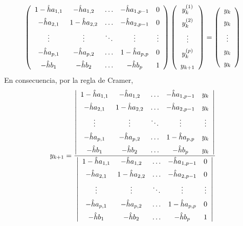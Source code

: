 \documentclass[11pt]{report}
\theoremstyle{mytheorem}
\theoremstyle{mydefinition}
\theoremstyle{myexample}
\begin{document}
\[\left( \begin{array}{ccccc}
     1-\hat{h}a_{1,1} & -\hat{h}a_{1,2} & \mathellipsis & -\hat{h}a_{1,p-1} & 0 \\[5pt]
     -\hat{h}a_{2,1} & 1-\hat{h}a_{2,2} & \mathellipsis & -\hat{h}a_{2,p-1} & 0 \\[5pt]
     \vdots & \vdots & \ddots & \vdots & \vdots \\[5pt]
     -\hat{h}a_{p,1} & -\hat{h}a_{p,2} & \mathellipsis & 1-\hat{h}a_{p,p} & 0 \\[5pt]
     -\hat{h}b_1 & -\hat{h}b_2 & \mathellipsis & -\hat{h}b_p & 1
\end{array} \right) \left( \begin{array}{c}
y_k^{(1)} \\[5pt]
y_k^{(2)} \\[5pt]
\vdots \\[5pt]
y_k^{(p)} \\[5pt]
y_{k+1}
\end{array} \right) = \left( \begin{array}{c}
y_k \\[5pt]
y_k \\[5pt]
\vdots \\[5pt]
y_k \\[5pt]
y_k
\end{array} \right)\]
En consecuencia, por la regla de Cramer,
\[y_{k+1} = \frac{
\left| \begin{array}{ccccc}
     1-\hat{h}a_{1,1} & -\hat{h}a_{1,2} & \mathellipsis & -\hat{h}a_{1,p-1} & y_k \\[5pt]
     -\hat{h}a_{2,1} & 1-\hat{h}a_{2,2} & \mathellipsis & -\hat{h}a_{2,p-1} & y_k \\[5pt]
     \vdots & \vdots & \ddots & \vdots & \vdots \\[5pt]
     -\hat{h}a_{p,1} & -\hat{h}a_{p,2} & \mathellipsis & 1-\hat{h}a_{p,p} & y_k \\[5pt]
     -\hat{h}b_1 & -\hat{h}b_2 & \mathellipsis & -\hat{h}b_p & y_k
\end{array} \right|
}{
\left| \begin{array}{ccccc}
     1-\hat{h}a_{1,1} & -\hat{h}a_{1,2} & \mathellipsis & -\hat{h}a_{1,p-1} & 0 \\[5pt]
     -\hat{h}a_{2,1} & 1-\hat{h}a_{2,2} & \mathellipsis & -\hat{h}a_{2,p-1} & 0 \\[5pt]
     \vdots & \vdots & \ddots & \vdots & \vdots \\[5pt]
     -\hat{h}a_{p,1} & -\hat{h}a_{p,2} & \mathellipsis & 1-\hat{h}a_{p,p} & 0 \\[5pt]
     -\hat{h}b_1 & -\hat{h}b_2 & \mathellipsis & -\hat{h}b_p & 1
\end{array} \right|
}\]
\end{document}

